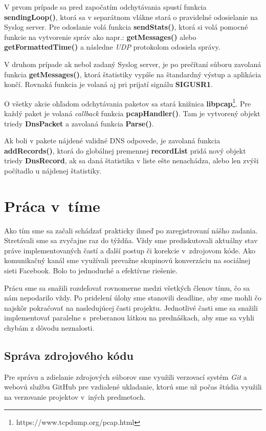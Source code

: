 \documentclass{article}
\begin{document}
        V prvom prípade sa pred započatím odchytávania spustí funkcia \textbf{sendingLoop()},
        ktorá sa v separátnom vlákne stará o pravidelné odosielanie na Syslog server. Pre odoslanie volá funkcia \textbf{sendStats()}, ktorá si volá
        pomocné funkcie na vytvorenie správ ako napr.: \textbf{getMessages()} alebo \textbf{getFormattedTime()} a následne \emph{UDP} protokolom 
        odosiela správy.

        V druhom prípade ak nebol zadaný Syslog server, je po prečítaní súboru zavolaná funkcia \textbf{getMessages()}, ktorá štatistiky vypíše
        na štandardný výstup a aplikácia končí. Rovnaká funkcia je volaná aj pri prijatí signálu \textbf{SIGUSR1}.

        O všetky akcie ohľadom odchytávania paketov sa stará knižnica \textbf{libpcap}\footnote{https://www.tcpdump.org/pcap.html}. Pre každý paket
        je volaná \emph{callback} funkcia \textbf{pcapHandler()}. Tam je vytvorený objekt triedy \textbf{DnsPacket} a zavolaná funkcia \textbf{Parse()}.

        Ak boli v pakete nájdené validné DNS odpovede, je zavolaná funkcia \textbf{addRecords()}, ktorá do globálnej premennej \textbf{recordList} pridá nový
        objekt triedy \textbf{DnsRecord}, ak sa daná štatistika v liste ešte nenachádza, alebo len zvýši počítadlo u nájdenej štatistiky.



    
    \section{Práca v~tíme}
    Ako tím sme sa začali schádzať prakticky ihneď po zaregistrovaní nášho zadania. Stretávali sme sa 
    zvyčajne raz do týždňa. Vždy sme prediskutovali aktuálny stav práve implementovaných častí 
    a ďalší postup či korekcie v~zdrojovom kóde. Ako komunikačný kanál sme využívali prevažne 
    skupinovú konverzáciu na sociálnej sieti Facebook. Bolo to jednoduché a efektívne riešenie.

    Prácu sme sa snažili rozdeľovať rovnomerne medzi všetkých členov tímu, čo sa nám nepodarilo vždy. 
    Po pridelení úlohy sme stanovili deadline, aby sme mohli čo najskôr pokračovať na nasledujúcej časti projektu. 
    Jednotlivé časti sme sa snažili implementovať paralelne s~preberanou látkou na prednáškach, aby sme sa vyhli chybám z dôvodu neznalosti.
    

        \subsection{Správa zdrojového kódu}
        Pre správu a zdielanie zdrojových súborov sme využili verzovací systém \emph{Git} a webovú službu GitHub pre vzdialené ukladanie, ktorú sme už počas štúdia využili na verzovanie projektov v~iných predmetoch.
        
\end{document}
